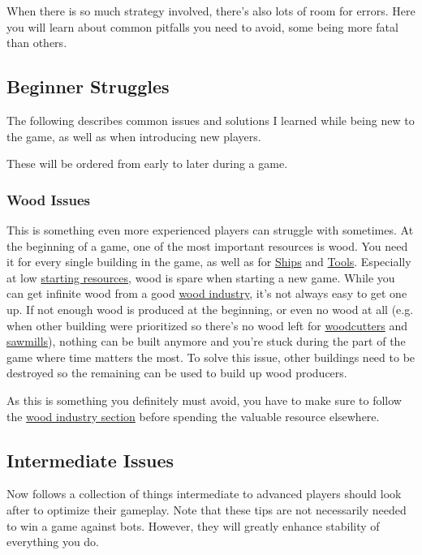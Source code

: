 \documentclass[12pt]{article}
\begin{document}
When there is so much strategy involved, there's also lots of room for errors. Here you will learn about common pitfalls you need to avoid, some being more fatal than others.

\subsection{Beginner Struggles}
\label{sec:beginnerstruggles}

The following describes common issues and solutions I learned while being new to the game, as well as when introducing new players.

These will be ordered from early to later during a game.

\subsubsection{Wood Issues}
\label{sec:woodissues}

This is something even more experienced players can struggle with sometimes. At the beginning of a game, one of the most important resources is wood. You need it for every single building in the game, as well as for \hyperref[sec:ships]{Ships} and \hyperref[sec:metalworks]{Tools}. Especially at low \hyperref[sec:startingresources]{starting resources}, wood is spare when starting a new game. While you can get infinite wood from a good \hyperref[sec:woodindustry]{wood industry}, it's not always easy to get one up. If not enough wood is produced at the beginning, or even no wood at all (e.g. when other building were prioritized so there's no wood left for \hyperref[sec:woodcutter]{woodcutters} and \hyperref[sec:sawmill]{sawmills}), nothing can be built anymore and you're stuck during the part of the game where time matters the most. To solve this issue, other buildings need to be destroyed so the remaining can be used to build up wood producers.

As this is something you definitely must avoid, you have to make sure to follow the \hyperref[sec:woodindustry]{wood industry section} before spending the valuable resource elsewhere.

\subsection{Intermediate Issues}
\label{sec:intermediateissues}

Now follows a collection of things intermediate to advanced players should look after to optimize their gameplay. Note that these tips are not necessarily needed to win a game against bots. However, they will greatly enhance stability of everything you do.
\end{document}
